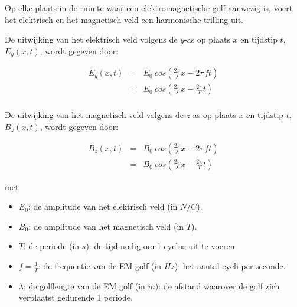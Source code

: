  Op elke plaats in de ruimte waar een elektromagnetische golf aanwezig is, voert het elektrisch en het magnetisch veld een harmonische trilling uit. 

 De uitwijking van het elektrisch veld volgens de $y$-as op plaats $x$ en tijdstip $t$, $E_y(x,t)$, wordt gegeven door:

 \begin{eqnarray*}
     E_y(x,t) &=& E_0 \ cos(\frac{2 \pi}{\lambda} x - 2 \pi f t) \\
     &=& E_0 \ cos(\frac{2 \pi}{\lambda} x - \frac{2 \pi}{T}  t) \\
 \end{eqnarray*}

 De uitwijking van het magnetisch veld volgens de $z$-as op plaats $x$ en tijdstip $t$, $B_z(x,t)$, wordt gegeven door:

 \begin{eqnarray*}
     B_z(x,t) &=& B_0 \ cos(\frac{2 \pi}{\lambda} x - 2 \pi f t) \\
     &=& B_0 \ cos(\frac{2 \pi}{\lambda} x - \frac{2 \pi}{T}  t)
 \end{eqnarray*}
 
 met 
 \begin{itemize}
     \item $E_0$: de amplitude van het elektrisch veld (in $N/C$).
     \item $B_0$: de amplitude van het magnetisch veld (in $T$).
     \item $T$: de periode (in $s$): de tijd nodig om 1 cyclus uit te voeren.
     \item $f=\frac{1}{T}$: de frequentie van de EM golf (in $Hz$): het aantal cycli per seconde.
     \item $\lambda$: de golflengte van de EM golf (in $m$): de afstand waarover de golf zich verplaatst gedurende 1 periode.
 \end{itemize}

